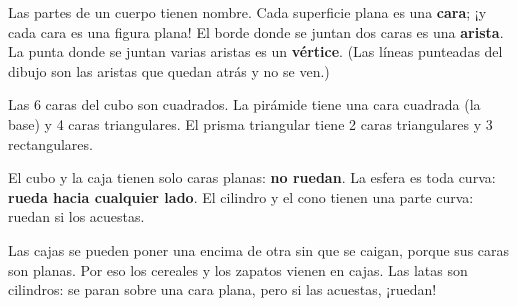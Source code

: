 \documentclass[11pt]{article}
\begin{document}
Las partes de un cuerpo tienen nombre. Cada superficie plana es una
\textbf{cara}; ¡y cada cara es una figura plana! El borde donde se juntan
dos caras es una \textbf{arista}. La punta donde se juntan varias aristas es
un \textbf{vértice}. (Las líneas punteadas del dibujo son las aristas que
quedan atrás y no se ven.)

\begin{center}
\end{center}

\begin{ejemplo}
Las 6 caras del cubo son cuadrados. La pirámide tiene una cara cuadrada (la
base) y 4 caras triangulares. El prisma triangular tiene 2 caras
triangulares y 3 rectangulares.
\end{ejemplo}

\begin{ejemplo}
El cubo y la caja tienen solo caras planas: \textbf{no ruedan}. La esfera es
toda curva: \textbf{rueda hacia cualquier lado}. El cilindro y el cono tienen
una parte curva: ruedan si los acuestas.
\end{ejemplo}

\begin{aplicacion}[En la tienda]
Las cajas se pueden poner una encima de otra sin que se caigan, porque sus
caras son planas. Por eso los cereales y los zapatos vienen en cajas. Las
latas son cilindros: se paran sobre una cara plana, pero si las acuestas,
¡ruedan!
\end{aplicacion}
\end{document}
